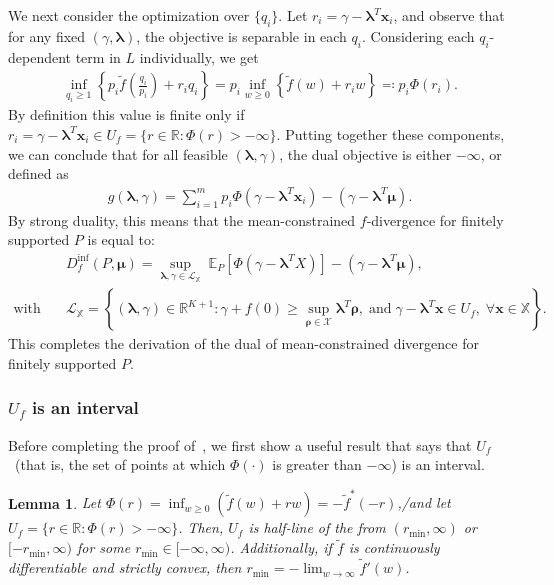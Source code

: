 \documentclass{article}
\theoremstyle{plain}
\newtheorem{lemma}[lemma]{Lemma}
\theoremstyle{definition}
\newcommand{\lrp}[1]{\left( #1 \right)}
\newcommand{\R}{\mathbb{R}}
\newcommand{\calX}{\mathcal X}
\newcommand{\calL}{\mathcal L}
\newcommand{\xvec}{\mathbf{x}}
\newcommand{\boldlambda}{\boldsymbol{\lambda}}
\newcommand{\boldmu}{\boldsymbol{\mu}}
\newcommand{\boldrho}{\boldsymbol{\rho}}
\newcommand{\finitesupport}{\mathbb{X}}
\newcommand{\ftilde}{\widetilde{f}}
\begin{document}
    We next consider the optimization over $\{q_i\}$. Let $r_i = \gamma - \boldlambda^T \xvec_i$, and observe that for any fixed $(\gamma, \boldlambda)$, the objective is separable in each $q_i$. Considering each  $q_i$-dependent term in $L$ individually, we get  
    \begin{align}
        \inf_{q_i \geq 1} \left\{ p_i \ftilde\lrp{\frac{q_i}{p_i}} + r_i q_i \right\} = p_i \inf_{w \geq 0} \left\{ \ftilde(w) + r_i w \right\} \eqcolon p_i \Phi(r_i). 
    \end{align}
    By definition this value is finite only if $r_i = \gamma - \boldlambda^T \xvec_i \in U_f = \{r \in \R: \Phi(r)> -\infty\}$. Putting together these components, we can conclude that for all feasible $(\boldlambda, \gamma)$, the dual objective is either $-\infty$, or defined as 
    \begin{align}
        g(\boldlambda, \gamma) = \sum_{i=1}^m p_i \Phi(\gamma - \boldlambda^T \xvec_i) - (\gamma - \boldlambda^T \boldmu). 
    \end{align}
    By strong duality, this means that the mean-constrained $f$-divergence for finitely supported $P$ is equal to: 
    \begin{align}
        &D_f^{\inf}(P, \boldmu) = \sup_{\boldlambda, \gamma \in \calL_{\finitesupport}}\; \mathbb{E}_P[\Phi(\gamma - \boldlambda^T X)] - (\gamma - \boldlambda^T \boldmu),   \\
        \text{with} \quad & \calL_{\finitesupport} = \left\{ (\boldlambda, \gamma) \in \R^{K+1}: \gamma + f(0) \geq \sup_{\boldrho \in \calX} \boldlambda^T \boldrho, \; \text{and} \; \gamma - \boldlambda^T \xvec \in U_f, \; \forall \xvec \in \finitesupport \right\}. 
    \end{align}
This completes the derivation of the dual of mean-constrained divergence for finitely supported $P$. \hfill \qedsymbol

\subsubsection{$U_f$ is an interval}
\label{proof:Uf-is-an-interval}
Before completing the proof of~, we first show a useful result that says that $U_f$~(that is, the set of points at which $\Phi(\cdot)$ is greater than $-\infty$) is an interval. 
\begin{lemma}
    \label{lemma:Uf-is-an-interval}
    Let $\Phi(r) = \inf_{w \geq 0} \lrp{\ftilde(w) + r w} = -\ftilde^*(-r)$,/and let $U_f = \{r \in \R: \Phi(r) > -\infty\}$. Then, $U_f$ is half-line of the from $(r_{\min}, \infty)$ or $[-r_{\min}, \infty)$ for some $r_{\min} \in [-\infty, \infty)$. Additionally, if $\ftilde$ is continuously differentiable and strictly convex, then $r_{\min}= - \lim_{w \to \infty} \ftilde'(w)$. 
\end{lemma}
\end{document}
